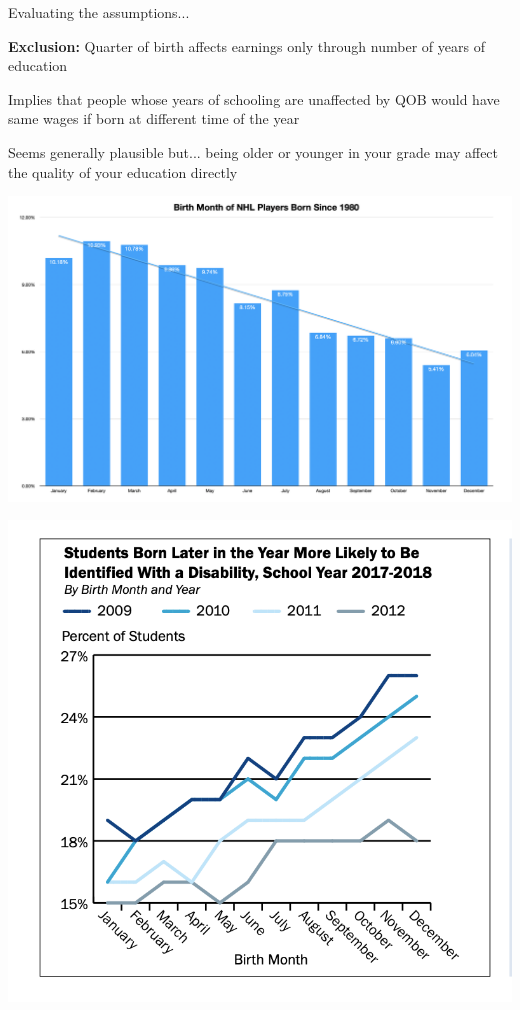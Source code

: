 \documentclass[11pt,english,handout]{beamer}
\newenvironment{wideitemize}{\itemize\addtolength{\itemsep}{10pt}}{\enditemize}
\begin{document}
\begin{frame}{Evaluating the assumptions...}
	
	\begin{wideitemize}
		\item
		\textbf{Exclusion: } Quarter of birth affects earnings only through number of years of education
		
		\pause
		\item
		Implies that people whose years of schooling are unaffected by QOB would have same wages if born at different time of the year
		
		\pause
		\item 
		Seems generally plausible but... \pause{} being older or younger in your grade may affect the quality of your education directly
					
	\end{wideitemize}
\end{frame}


\begin{frame}
	\includegraphics[width = 0.7\linewidth]{nhl-births}
\end{frame}

\begin{frame}
	\includegraphics[width = 0.7 \linewidth]{qob-disabilities}
\end{frame}
\end{document}
